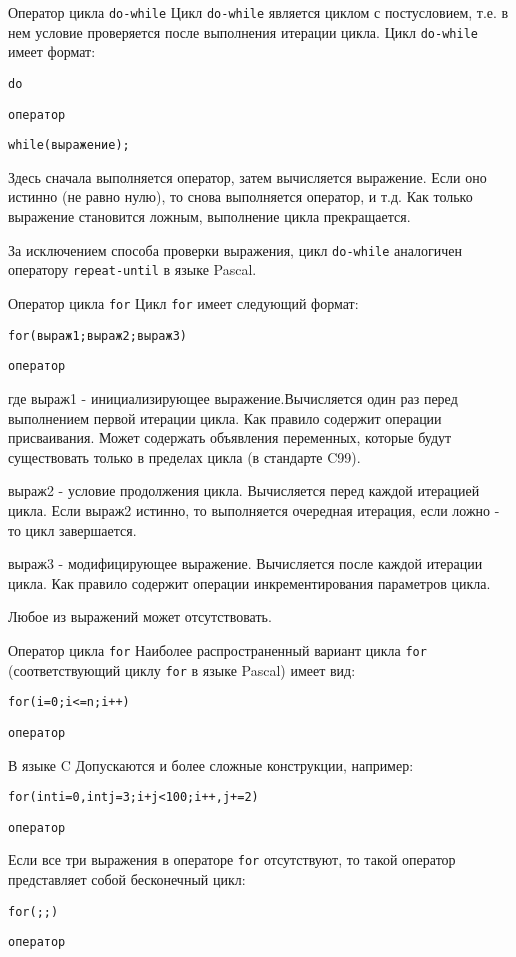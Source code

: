 \documentclass[xcolor=table]{beamer}
\begin{document}
\begin{frame}{Оператор цикла \texttt{do-while}}
    Цикл \texttt{do-while} является циклом с постусловием, т.е. в нем условие проверяется после выполнения итерации цикла. Цикл \texttt{do-while} имеет формат:
    \begin{alltt}
        do
            
        \qquad оператор
        
        while (выражение);
    \end{alltt}
    Здесь сначала выполняется оператор, затем вычисляется выражение. Если оно истинно (не равно нулю), то снова выполняется оператор, и т.д. Как только выражение становится ложным, выполнение цикла прекращается.
    
    За исключением способа проверки выражения, цикл \texttt{do-while} аналогичен оператору \texttt{repeat-until} в языке Pascal.
\end{frame}

\begin{frame}{Оператор цикла \texttt{for}}
    Цикл \texttt{for} имеет следующий формат:
    \begin{alltt}
        for (выраж1; выраж2; выраж3)
            
        \qquad оператор
    \end{alltt}
    где выраж1 - инициализирующее выражение.Вычисляется один раз перед выполнением первой итерации цикла. Как правило содержит операции присваивания. Может содержать объявления переменных, которые будут существовать только в пределах цикла (в стандарте C99).
    
    выраж2 - условие продолжения цикла. Вычисляется перед каждой итерацией цикла. Если выраж2 истинно, то выполняется очередная итерация, если ложно - то цикл завершается.
    
    выраж3 - модифицирующее выражение. Вычисляется после каждой итерации цикла. Как правило содержит операции инкрементирования параметров цикла.
    
    Любое из выражений может отсутствовать.
\end{frame}

\begin{frame}{Оператор цикла \texttt{for}}
    Наиболее распространенный вариант цикла \texttt{for} (соответствующий циклу \texttt{for} в языке Pascal) имеет вид:
    \begin{alltt}
        for (i = 0; i <= n; i++)
            
        \qquad оператор
    \end{alltt}
    В  языке C Допускаются и более сложные конструкции, например:
    \begin{alltt}
        for (int i = 0, int j = 3; i + j < 100; i++, j+=2)
            
        \qquad оператор
    \end{alltt}
    Если все три выражения в операторе \texttt{for} отсутствуют, то такой оператор представляет собой бесконечный цикл:
    \begin{alltt}
        for (;;)
            
        \qquad оператор
    \end{alltt}
\end{frame}
\end{document}
